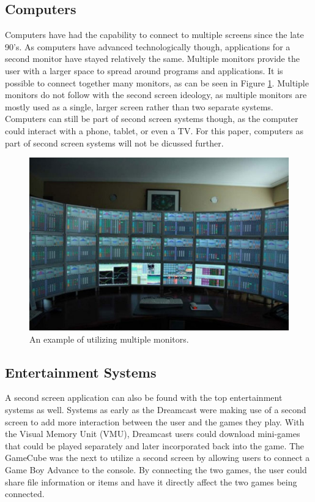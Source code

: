 \documentclass[11pt, oneside]{article}
\begin{document}
\subsection{Computers}
Computers have had the capability to connect to multiple screens since the late 90's. As computers have advanced technologically though, applications for a second monitor have stayed relatively the same. Multiple monitors provide the user with a larger space to spread around programs and applications. It is possible to connect together many monitors, as can be seen in Figure \ref{monitors}. Multiple monitors do not follow with the second screen ideology, as multiple monitors are mostly used as a single, larger screen rather than two separate systems. Computers can still be part of second screen systems though, as the computer could interact with a phone, tablet, or even a TV. For this paper, computers as part of second screen systems will not be dicussed further.

\begin{figure}
    \centering
    \includegraphics[width=.8\textwidth]{Multiple-Monitor-Setup.jpg}
    \caption{An example of utilizing multiple monitors.}
    \label{monitors}
\end{figure}

\subsection{Entertainment Systems}
A second screen application can also be found with the top entertainment systems as well. Systems as early as the Dreamcast were making use of a second screen to add more interaction between the user and the games they play. With the Visual Memory Unit (VMU), Dreamcast users could download mini-games that could be played separately and later incorporated back into the game. The GameCube was the next to utilize a second screen by allowing users to connect a Game Boy Advance to the console. By connecting the two games, the user could share file information or items and have it directly affect the two games being connected.
\end{document}
